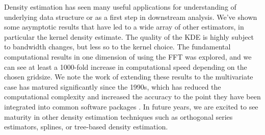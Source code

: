 \documentclass[12pt]{article}
\begin{document}
Density estimation has seen many useful applications for understanding
of underlying data structure or as a first step in downstream analysis.
We've shown some asymptotic results that have led to a wide array of
other estimators, in particular the kernel density estimate. The quality
of the KDE is highly subject to bandwidth changes, but less so to the
kernel choice. The fundamental computational results in one dimension of
using the FFT was explored, and we can see at least a 1000-fold increase
in computational speed depending on the chosen gridsize. We note the
work of extending these results to the multivariate case has matured
significantly since the 1990s, which has reduced the computational
complexity and increased the accuracy to the point they have been
integrated into common software packages \citep{chen2017tutorial}. In
future years, we are excited to see maturity in other density estimation
techniques such as orthogonal series estimators, splines, or tree-based
density estimation.



\end{document}
